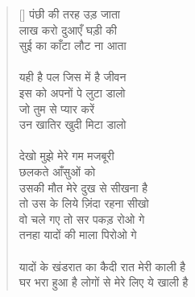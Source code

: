 \begin{verse}[\versewidth]
{पंछी की तरह उड़ जाता\\
लाख करो दुआएँ घड़ी की\\
सुई का काँटा लौट ना आता\\
\\
यही है पल जिस में है जीवन\\
इस को अपनों पे लुटा डालो\\
जो तुम से प्यार करें\\
उन खातिर खुदी मिटा डालो\\
\\
देखो मुझे मेरे गम मजबूरी\\
छलकते आँसुओं को\\
उसकी मौत मेरे दुख से सीखना है\\
तो उस के लिये ज़िंदा रहना सीखो\\
वो चले गए तो सर पकड़ रोओ गे\\
तनहा यादों की माला पिरोओ गे\\
\\
यादों के खंडरात का कैदी रात मेरी काली है\\
घर भरा हुआ है लोगों से मेरे लिए ये खाली है
}\end{verse}

